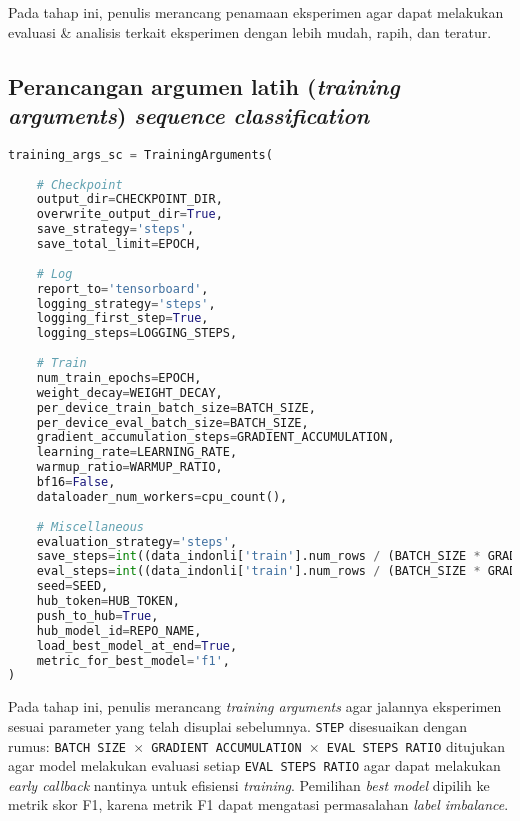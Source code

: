 Pada tahap ini, penulis merancang penamaan eksperimen agar dapat melakukan evaluasi \& analisis terkait eksperimen dengan lebih mudah, rapih, dan teratur.

\subsection{Perancangan argumen latih (\emph{training arguments}) \emph{sequence classification}}
\begin{lstlisting}[language=Python, caption=Perancangan argumen latih (\emph{training arguments}) \emph{sequence classification}]
training_args_sc = TrainingArguments(
        
    # Checkpoint
    output_dir=CHECKPOINT_DIR,
    overwrite_output_dir=True,
    save_strategy='steps',
    save_total_limit=EPOCH,
    
    # Log
    report_to='tensorboard',
    logging_strategy='steps',
    logging_first_step=True,
    logging_steps=LOGGING_STEPS,
    
    # Train
    num_train_epochs=EPOCH,
    weight_decay=WEIGHT_DECAY,
    per_device_train_batch_size=BATCH_SIZE,
    per_device_eval_batch_size=BATCH_SIZE,
    gradient_accumulation_steps=GRADIENT_ACCUMULATION,
    learning_rate=LEARNING_RATE,
    warmup_ratio=WARMUP_RATIO,
    bf16=False,
    dataloader_num_workers=cpu_count(),
    
    # Miscellaneous
    evaluation_strategy='steps',
    save_steps=int((data_indonli['train'].num_rows / (BATCH_SIZE * GRADIENT_ACCUMULATION)) * EVAL_STEPS_RATIO),
    eval_steps=int((data_indonli['train'].num_rows / (BATCH_SIZE * GRADIENT_ACCUMULATION)) * EVAL_STEPS_RATIO),
    seed=SEED,
    hub_token=HUB_TOKEN,
    push_to_hub=True,
    hub_model_id=REPO_NAME,
    load_best_model_at_end=True,
    metric_for_best_model='f1',
)
\end{lstlisting}

Pada tahap ini, penulis merancang \emph{training arguments} agar jalannya eksperimen sesuai parameter yang telah disuplai sebelumnya. \texttt{STEP} disesuaikan dengan rumus: \texttt{BATCH SIZE $\times$ GRADIENT ACCUMULATION $\times$ EVAL STEPS RATIO} ditujukan agar model melakukan evaluasi setiap \texttt{EVAL STEPS RATIO} agar dapat melakukan \emph{early callback} nantinya untuk efisiensi \emph{training}. Pemilihan \emph{best model} dipilih ke metrik skor F1, karena metrik F1 dapat mengatasi permasalahan \emph{label imbalance}.


